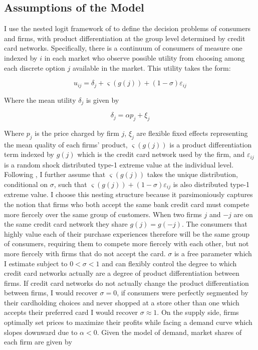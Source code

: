\documentclass[12pt,english]{article}
\begin{document}
\subsection{Assumptions of the Model}

I use the nested logit framework of \cite{miller_notes_2019} to define the decision problems of consumers and firms, with product differentiation at the group level determined by credit card networks. Specifically, there is a continuum of consumers of measure one indexed by $i$ in each market who observe possible utility from choosing among each discrete option $j$ available in the market. This utility takes the form: 

\begin{equation}\label{eq:utility}
    u_{ij}= \delta_j +\varsigma(g(j)) + \left(1-\sigma\right)\varepsilon_{ij}
\end{equation}

Where the mean utility $\delta_j$ is given by 

\begin{equation}\label{eq:delta}
    \delta_j = \alpha p_j + \xi_j
\end{equation}

Where $p_j$ is the price charged by firm $j$, $\xi_j$ are flexible fixed effects representing the mean quality of each firms' product, $\varsigma(g(j))$ is a product differentiation term indexed by $g(j)$ which is the credit card network used by the firm, and $\varepsilon_{ij}$ is a random shock distributed type-1 extreme value at the individual level. Following \cite{miller_notes_2019}, I further assume that $\varsigma(g(j))$ takes the unique distribution, conditional on $\sigma$, such that $\varsigma(g(j)) + \left(1-\sigma\right)\varepsilon_{ij}$ is also distributed type-1 extreme value. 
I choose this nesting structure because it parsimoniously captures the notion that firms who both accept the same bank credit card must compete more fiercely over the same group of customers. When two firms $j$ and $-j$ are on the same credit card network they share $g(j) = g(-j)$. The consumers that highly value each of their purchase experiences therefore will be the same group of consumers, requiring them to compete more fiercely with each other, but not more fiercely with firms that do not accept the card. $\sigma$ is a free parameter which I estimate subject to $0 < \sigma < 1$ and can flexibly control the degree to which credit card networks actually are a degree of product differentiation between firms. If credit card networks do not actually change the product differentiation between firms, I would recover $\sigma = 0$, if consumers were perfectly segmented by their cardholding choices and never shopped at a store other than one which accepts their preferred card I would recover $\sigma \approx 1$. 
On the supply side, firms optimally set prices to maximize their profits while facing a demand curve which slopes downward due to $\alpha < 0$. Given the model of demand, market shares of each firm are given by 
\end{document}

